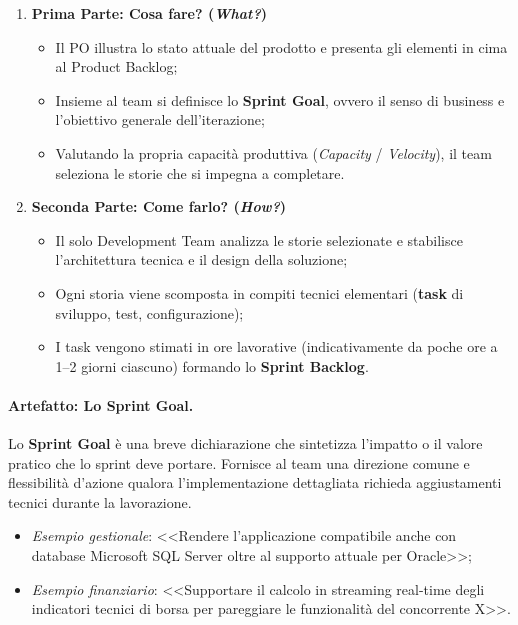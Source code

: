 \documentclass[12pt]{extarticle}
\begin{document}
\begin{enumerate}
    \item \textbf{Prima Parte: Cosa fare? (\textit{What?})}
    \begin{itemize}
        \item Il PO illustra lo stato attuale del prodotto e presenta gli elementi in cima al Product Backlog;
        \item Insieme al team si definisce lo \textbf{Sprint Goal}, ovvero il senso di business e l'obiettivo generale dell'iterazione;
        \item Valutando la propria capacità produttiva (\textit{Capacity} / \textit{Velocity}), il team seleziona le storie che si impegna a completare.
    \end{itemize}
    \item \textbf{Seconda Parte: Come farlo? (\textit{How?})}
    \begin{itemize}
        \item Il solo Development Team analizza le storie selezionate e stabilisce l'architettura tecnica e il design della soluzione;
        \item Ogni storia viene scomposta in compiti tecnici elementari (\textbf{task} di sviluppo, test, configurazione);
        \item I task vengono stimati in ore lavorative (indicativamente da poche ore a 1--2 giorni ciascuno) formando lo \textbf{Sprint Backlog}.
    \end{itemize}
\end{enumerate}

\paragraph{Artefatto: Lo Sprint Goal.}
Lo \textbf{Sprint Goal} è una breve dichiarazione che sintetizza l'impatto o il valore pratico che lo sprint deve portare. Fornisce al team una direzione comune e flessibilità d'azione qualora l'implementazione dettagliata richieda aggiustamenti tecnici durante la lavorazione.
\begin{itemize}
    \item \textit{Esempio gestionale}: <<Rendere l'applicazione compatibile anche con database Microsoft SQL Server oltre al supporto attuale per Oracle>>;
    \item \textit{Esempio finanziario}: <<Supportare il calcolo in streaming real-time degli indicatori tecnici di borsa per pareggiare le funzionalità del concorrente X>>.
\end{itemize}
\end{document}
